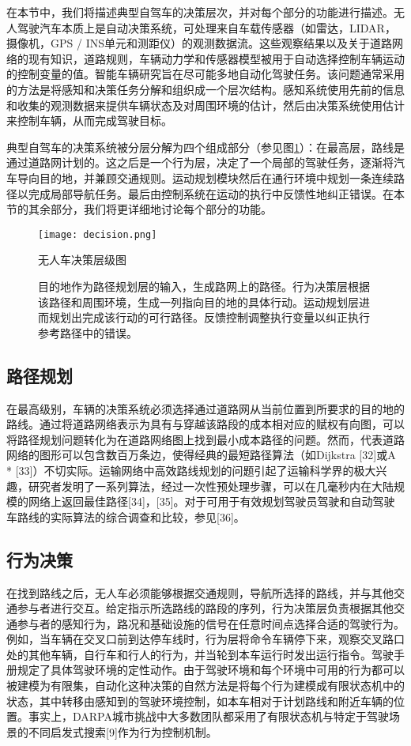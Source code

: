 在本节中，我们将描述典型自驾车的决策层次，并对每个部分的功能进行描述。无人驾驶汽车本质上是自动决策系统，可处理来自车载传感器（如雷达，LIDAR，摄像机，GPS / INS单元和测距仪）的观测数据流。这些观察结果以及关于道路网络的现有知识，道路规则，车辆动力学和传感器模型被用于自动选择控制车辆运动的控制变量的值。智能车辆研究旨在尽可能多地自动化驾驶任务。该问题通常采用的方法是将感知和决策任务分解和组织成一个层次结构。感知系统使用先前的信息和收集的观测数据来提供车辆状态及对周围环境的估计，然后由决策系统使用估计来控制车辆，从而完成驾驶目标。

典型自驾车的决策系统被分层分解为四个组成部分（参见图\ref{fig:decision}）：在最高层，路线是通过道路网计划的。这之后是一个行为层，决定了一个局部的驾驶任务，逐渐将汽车导向目的地，并兼顾交通规则。运动规划模块然后在通行环境中规划一条连续路径以完成局部导航任务。最后由控制系统在运动的执行中反馈性地纠正错误。在本节的其余部分，我们将更详细地讨论每个部分的功能。

\begin{figure}
\centering
\texttt{[image: decision.png]}
\caption{无人车决策层级图}
\caption*{目的地作为路径规划层的输入，生成路网上的路径。行为决策层根据该路径和周围环境，生成一列指向目的地的具体行动。运动规划层进而规划出完成该行动的可行路径。反馈控制调整执行变量以纠正执行参考路径中的错误。}
\label{fig:decision}
\end{figure}

\subsection{路径规划}
在最高级别，车辆的决策系统必须选择通过道路网从当前位置到所要求的目的地的路线。通过将道路网络表示为具有与穿越该路段的成本相对应的赋权有向图，可以将路径规划问题转化为在道路网络图上找到最小成本路径的问题。然而，代表道路网络的图形可以包含数百万条边，使得经典的最短路径算法（如Dijkstra [32]或A * [33]）不切实际。运输网络中高效路线规划的问题引起了运输科学界的极大兴趣，研究者发明了一系列算法，经过一次性预处理步骤，可以在几毫秒内在大陆规模的网络上返回最佳路径[34]，[35]。对于可用于有效规划驾驶员驾驶和自动驾驶车路线的实际算法的综合调查和比较，参见[36]。

\subsection{行为决策}
在找到路线之后，无人车必须能够根据交通规则，导航所选择的路线，并与其他交通参与者进行交互。给定指示所选路线的路段的序列，行为决策层负责根据其他交通参与者的感知行为，路况和基础设施的信号在任意时间点选择合适的驾驶行为。例如，当车辆在交叉口前到达停车线时，行为层将命令车辆停下来，观察交叉路口处的其他车辆，自行车和行人的行为，并当轮到本车运行时发出运行指令。驾驶手册规定了具体驾驶环境的定性动作。由于驾驶环境和每个环境中可用的行为都可以被建模为有限集，自动化这种决策的自然方法是将每个行为建模成有限状态机中的状态，其中转移由感知到的驾驶环境控制，如本车相对于计划路线和附近车辆的位置。事实上，DARPA城市挑战中大多数团队都采用了有限状态机与特定于驾驶场景的不同启发式搜索[9]作为行为控制机制。

